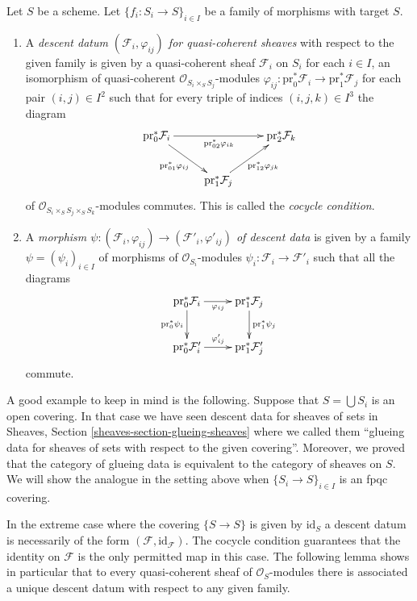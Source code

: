 \begin{definition}
\label{definition-descent-datum-quasi-coherent}
Let $S$ be a scheme. Let $\{f_i : S_i \to S\}_{i \in I}$ be a family
of morphisms with target $S$.
\begin{enumerate}
\item A {\it descent datum $(\mathcal{F}_i, \varphi_{ij})$
for quasi-coherent sheaves} with respect to the given family
is given by a quasi-coherent sheaf $\mathcal{F}_i$ on $S_i$ for
each $i \in I$, an isomorphism of quasi-coherent
$\mathcal{O}_{S_i \times_S S_j}$-modules
$\varphi_{ij} : \text{pr}_0^*\mathcal{F}_i \to \text{pr}_1^*\mathcal{F}_j$
for each pair $(i, j) \in I^2$
such that for every triple of indices $(i, j, k) \in I^3$ the
diagram
$$
\xymatrix{
\text{pr}_0^*\mathcal{F}_i \ar[rd]_{\text{pr}_{01}^*\varphi_{ij}}
\ar[rr]_{\text{pr}_{02}^*\varphi_{ik}} & &
\text{pr}_2^*\mathcal{F}_k \\
& \text{pr}_1^*\mathcal{F}_j \ar[ru]_{\text{pr}_{12}^*\varphi_{jk}} &
}
$$
of $\mathcal{O}_{S_i \times_S S_j \times_S S_k}$-modules
commutes. This is called the {\it cocycle condition}.
\item A {\it morphism $\psi : (\mathcal{F}_i, \varphi_{ij}) \to
(\mathcal{F}'_i, \varphi'_{ij})$ of descent data} is given
by a family $\psi = (\psi_i)_{i\in I}$ of morphisms of
$\mathcal{O}_{S_i}$-modules $\psi_i : \mathcal{F}_i \to \mathcal{F}'_i$
such that all the diagrams
$$
\xymatrix{
\text{pr}_0^*\mathcal{F}_i \ar[r]_{\varphi_{ij}} \ar[d]_{\text{pr}_0^*\psi_i}
& \text{pr}_1^*\mathcal{F}_j \ar[d]^{\text{pr}_1^*\psi_j} \\
\text{pr}_0^*\mathcal{F}'_i \ar[r]^{\varphi'_{ij}} &
\text{pr}_1^*\mathcal{F}'_j \\
}
$$
commute.
\end{enumerate}
\end{definition}

\noindent
A good example to keep in mind is the following.
Suppose that $S = \bigcup S_i$ is an open covering.
In that case we have seen descent data for sheaves of sets in
Sheaves, Section \ref{sheaves-section-glueing-sheaves}
where we called them ``glueing data for sheaves of sets
with respect to the given covering''. Moreover, we proved
that the category of glueing data is equivalent to the category
of sheaves on $S$. We will show the analogue in the setting above when
$\{S_i \to S\}_{i\in I}$ is an fpqc covering.

\medskip\noindent
In the extreme case where the covering $\{S \to S\}$
is given by $\text{id}_S$ a descent datum is necessarily
of the form $(\mathcal{F}, \text{id}_\mathcal{F})$. The cocycle
condition guarantees that the identity on $\mathcal{F}$ is the
only permitted map in this case. The following lemma shows
in particular that to every quasi-coherent sheaf of
$\mathcal{O}_S$-modules there is associated a unique
descent datum with respect to any given family.

